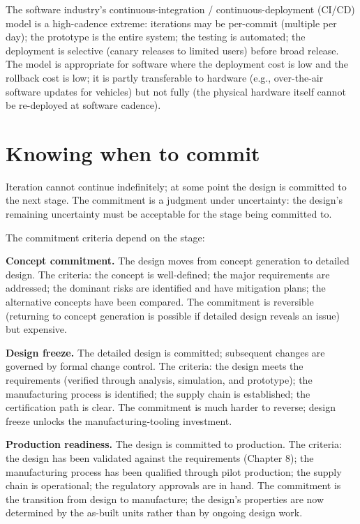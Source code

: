 The software industry's continuous-integration / continuous-deployment (CI/CD) model is a high-cadence extreme: iterations may be per-commit (multiple per day); the prototype is the entire system; the testing is automated; the deployment is selective (canary releases to limited users) before broad release. The model is appropriate for software where the deployment cost is low and the rollback cost is low; it is partly transferable to hardware (e.g., over-the-air software updates for vehicles) but not fully (the physical hardware itself cannot be re-deployed at software cadence).

\section{Knowing when to commit}

Iteration cannot continue indefinitely; at some point the design is committed to the next stage. The commitment is a judgment under uncertainty: the design's remaining uncertainty must be acceptable for the stage being committed to.

The commitment criteria depend on the stage:

\textbf{Concept commitment.} The design moves from concept generation to detailed design. The criteria: the concept is well-defined; the major requirements are addressed; the dominant risks are identified and have mitigation plans; the alternative concepts have been compared. The commitment is reversible (returning to concept generation is possible if detailed design reveals an issue) but expensive.

\textbf{Design freeze.} The detailed design is committed; subsequent changes are governed by formal change control. The criteria: the design meets the requirements (verified through analysis, simulation, and prototype); the manufacturing process is identified; the supply chain is established; the certification path is clear. The commitment is much harder to reverse; design freeze unlocks the manufacturing-tooling investment.

\textbf{Production readiness.} The design is committed to production. The criteria: the design has been validated against the requirements (Chapter 8); the manufacturing process has been qualified through pilot production; the supply chain is operational; the regulatory approvals are in hand. The commitment is the transition from design to manufacture; the design's properties are now determined by the as-built units rather than by ongoing design work.

